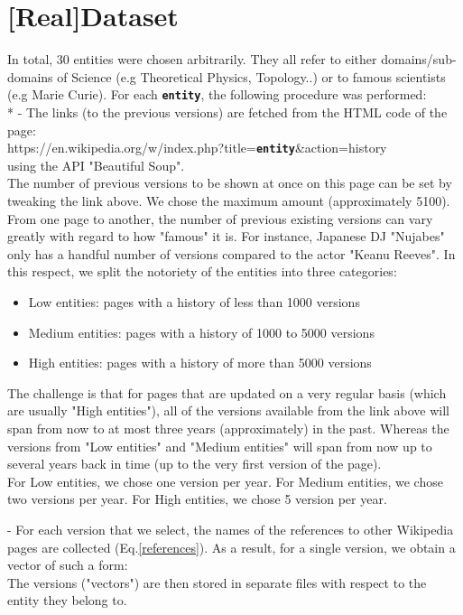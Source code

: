 \documentclass[sigconf]{acmart}
\begin{document}
\section{[Real]\:Dataset}
In total, 30 entities were chosen arbitrarily. They all refer to either domains/sub-domains of Science (e.g Theoretical Physics, Topology..) or to famous scientists (e.g Marie Curie). For each \textbf{\texttt{entity}}, the following procedure was performed:\\*
- The links (to the previous versions) are fetched from the HTML code of the page:\\
https://en.wikipedia.org/w/index.php?title=\textbf{\texttt{entity}}\&action=history\\
using the API "Beautiful Soup".\\ 
The number of previous versions to be shown at once on this page can be set by tweaking the link above. We chose the maximum amount (approximately 5100). From one page to another, the number of previous existing versions can vary greatly with regard to how "famous" it is. For instance, Japanese DJ "Nujabes" only has a handful number of versions compared to the actor "Keanu Reeves". 
In this respect, we split the notoriety of the entities into three categories:
\begin{itemize}
    \item Low entities: pages with a history of less than 1000 versions
    \item Medium entities: pages with a history of 1000 to 5000 versions
    \item High entities: pages with a history of more than 5000 versions
\end{itemize}
The challenge is that for pages that are updated on a very regular basis (which are usually "High entities"), all of the versions available from the link above will span from now to at most three years (approximately) in the past. 
Whereas the versions from "Low entities" and "Medium entities" will span from now up to several years back in time (up to the very first version of the page).\\
For Low entities, we chose one version per year.
For Medium entities, we chose two versions per year.
For High entities, we chose 5 version per year.

- For each version that we select, the names of the references to other Wikipedia pages are collected (Eq.\ref{references}). As a result, for a single version, we obtain a vector of such a form:
\begin{equation}
    [date, r_1,r_2,...]
\end{equation}
The versions ("vectors") are then stored in separate files with respect to the entity they belong to.
\newpage
\end{document}
